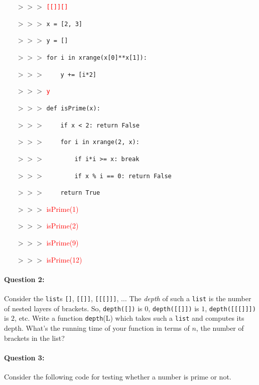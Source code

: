 \documentclass[11pt]{article}
\newcommand{\ans}[1]{\textcolor{red}{#1}}
\begin{document}
\begin{itemize}
\item[$>>>$]\ans{\texttt{[[]][]}}
\item[]
\item[$>>>$] \texttt{x = [2, 3]}
\item[$>>>$] \texttt{y = []}
\item[$>>>$] \texttt{for i in xrange(x[0]**x[1]):}
\item[$>>>$] \ \ \ \ \texttt{y += [i*2]}
\item[$>>>$] \ans{\texttt{y}}
\item[]
\item[$>>>$] \texttt{def isPrime(x):}
\item[$>>>$] \ \ \ \ \texttt{if x < 2: return False}
\item[$>>>$] \ \ \ \ \texttt{for i in xrange(2, x):}
\item[$>>>$] \ \ \ \ \ \ \ \ \texttt{if i*i >= x: break}
\item[$>>>$] \ \ \ \ \ \ \ \ \texttt{if x \% i == 0: return False}
\item[$>>>$] \ \ \ \ \texttt{return True}
\item[$>>>$]\ans{isPrime(1)}
\item[]
\item[$>>>$]\ans{isPrime(2)}
\item[]
\item[$>>>$]\ans{isPrime(9)}
\item[]
\item[$>>>$]\ans{isPrime(12)}
\item[]
\end{itemize}

\paragraph{Question 2:}
Consider the \texttt{list}s \texttt{[]}, \texttt{[[]]},
\texttt{[[[]]]}, $\ldots$  The {\em depth} of such a \texttt{list} is
the
number of nested layers of brackets.  So, \texttt{depth([])} is $0$,
\texttt{depth([[]])} is $1$, \texttt{depth([[[]]])} is $2$, etc.
Write a function \texttt{depth}(L) which takes such a \texttt{list}
and computes its depth.  What's the running time of your function in
terms of $n$, the number of brackets in the list?

\paragraph{Question 3:}
Consider the following code for testing whether a number is prime or
not.
\end{document}
